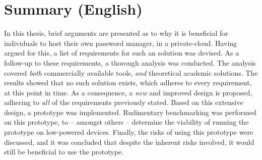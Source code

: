 \chapter{Summary (English)}
	In this thesis, brief arguments are presented as to why it is beneficial for individuals to host their own password manager, in a private-cloud. Having argued for this, a list of requirements for such an solution was devised. As a follow-up to these requirements, a thorough analysis was conducted. The analysis covered \emph{both} commercially available tools, \emph{and} theoretical academic solutions. The results showed that no such solution exists, which adheres to every requirement, at this point in time. As a consequence, a \emph{new} and improved design is proposed, adhering to \emph{all} of the requirements previously stated. Based on this extensive design, a prototype was implemented. Rudimentary benchmarking was performed on this prototype, to -- amongst others -- determine the viability of running the prototype on low-powered devices. Finally, the risks of using this prototype were discussed, and it was concluded that despite the inherent risks involved, it would still be beneficial to use the prototype.